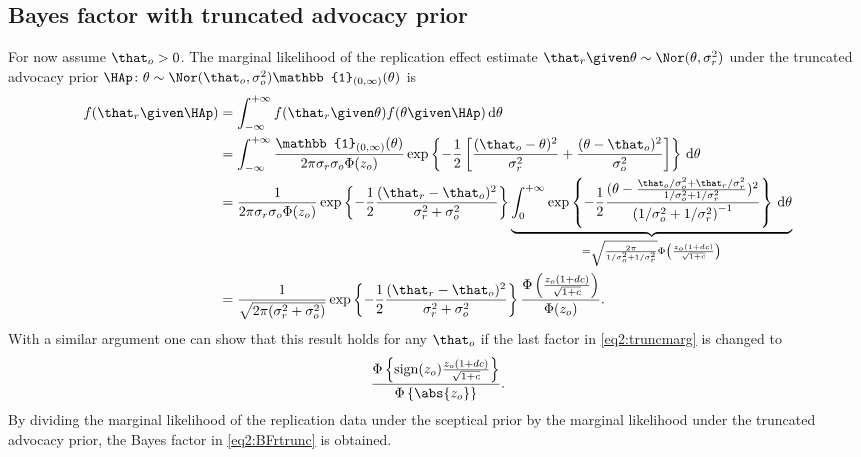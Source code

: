 \begin{subappendices}
\section{Bayes factor with truncated advocacy prior}
\label{app:BFtrunc}
For now assume $\that_o > 0$. The marginal likelihood of the replication effect
estimate \mbox{$\that_r \given \theta \sim \Nor(\theta, \sigma^2_r)$} under the
truncated advocacy prior
$\HAp \colon \theta \sim \Nor(\that_o, \sigma^2_o) \mathbb{1}_{(0, \infty)}(\theta)$
is
\begin{align}
  f(\that_r \given \HAp)
  &= \int_{-\infty}^{+\infty} f(\that_r \given \theta) f(\theta \given
  \HAp) \, \text{d}\theta \nonumber \\
  &= \int_{-\infty}^{+\infty}
  \frac{\mathbb{1}_{(0, \infty)}(\theta)}{2\pi\sigma_r\sigma_o\Phi(z_o)}
  \exp\left\{-\frac{1}{2}\left[\frac{(\that_o - \theta)^2}{\sigma^2_r}
  + \frac{(\theta - \that_o)^2}{\sigma^2_o}\right]\right\}
  \, \text{d}\theta \nonumber \\
  &=
  \frac{1}{2\pi\sigma_r\sigma_o\Phi(z_o)}
  \exp\left\{-\frac{1}{2}\frac{(\that_r - \that_o)^2}{\sigma^2_r + \sigma^2_o}\right\}
   \underbrace{\int_{0}^{+\infty}
   \exp\left\{-\frac{1}{2}\frac{(\theta - \frac{\that_o/\sigma^2_o +
       \that_r/\sigma^2_r}{1/\sigma^2_o + 1/\sigma^2_r})^2}{\left(
     1/\sigma^2_o + 1/\sigma^2_r\right)^{-1}}\right\}
   \, \text{d}\theta}_{=\sqrt{\frac{2\pi}{1/\sigma^2_o + 1/\sigma^2_r}}
  \Phi\left(\frac{z_o(1 + dc)}{\sqrt{1 + c}}\right)} \nonumber \\
   &= \frac{1}{\sqrt{2\pi(\sigma_r^2 + \sigma_o^2)}}
   \exp\left\{-\frac{1}{2}\frac{(\that_r - \that_o)^2}{\sigma^2_r + \sigma^2_o}
     \right\}  \frac{\Phi\left(\frac{z_o(1 + dc)}{\sqrt{1 + c}}\right)}{
     \Phi(z_o)}.
   \label{eq2:truncmarg}
\end{align}
With a similar argument one can show that this result holds for any $\that_o$ if
the last factor in \eqref{eq2:truncmarg} is changed to
\begin{align*}
  \frac{\Phi\left\{\text{sign}(z_o) \frac{z_o(1 + dc)}{\sqrt{1 + c}}
  \right\}}{\Phi\left\{\abs{z_o}\right\}}.
\end{align*}
By dividing the marginal likelihood of the replication data under the
sceptical prior by the marginal likelihood under the truncated advocacy prior,
the Bayes factor in \eqref{eq2:BFrtrunc} is obtained.



\end{subappendices}
